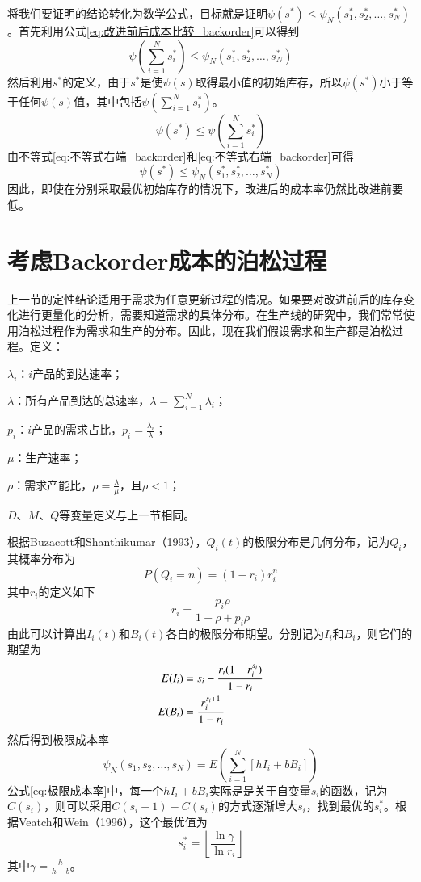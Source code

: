 将我们要证明的结论转化为数学公式，目标就是证明$\psi(s^*)\leq\psi_N(s_1^*,s_2^*,\ldots,s_N^*)$。首先利用公式\ref{eq:改进前后成本比较_backorder}可以得到
\begin{equation}
\psi(\sum_{i=1}^Ns_i^*) \leq \psi_N(s_1^*,s_2^*,\ldots,s_N^*)
\label{eq:不等式右端_backorder}
\end{equation}
然后利用$s^*$的定义，由于$s^*$是使$\psi(s)$取得最小值的初始库存，所以$\psi(s^*)$小于等于任何$\psi(s)$值，其中包括$\psi(\sum_{i=1}^Ns_i^*)$。
\begin{equation}
\psi(s^*) \leq \psi(\sum_{i=1}^Ns_i^*)
\label{eq:不等式右端_backorder}
\end{equation}
由不等式\ref{eq:不等式右端_backorder}和\ref{eq:不等式右端_backorder}可得
\[
\psi(s^*) \leq \psi_N(s_1^*,s_2^*,\ldots,s_N^*)
\]
因此，即使在分别采取最优初始库存的情况下，改进后的成本率仍然比改进前要低。









\section{考虑Backorder成本的泊松过程}

上一节的定性结论适用于需求为任意更新过程的情况。如果要对改进前后的库存变化进行更量化的分析，需要知道需求的具体分布。在生产线的研究中，我们常常使用泊松过程作为需求和生产的分布。因此，现在我们假设需求和生产都是泊松过程。定义：

$\lambda_i$：$i$产品的到达速率；

$\lambda$：所有产品到达的总速率，$\lambda=\sum_{i=1}^N\lambda_i$；

$p_i$：$i$产品的需求占比，$p_i=\frac{\lambda_i}{\lambda}$；

$\mu$：生产速率；

$\rho$：需求产能比，$\rho = \frac{\lambda}{\mu}$，且$\rho<1$；

$D$、$M$、$Q$等变量定义与上一节相同。

根据Buzacott和Shanthikumar（1993）\cite{buzacott_stochastic_1993}，$Q_i(t)$的极限分布是几何分布，记为$Q_i$，其概率分布为
\[
P(Q_i=n)=(1-r_i)r_i^n
\]
其中$r_i$的定义如下
\[
r_i = \frac{p_i\rho}{1-\rho+p_i\rho}
\]
由此可以计算出$I_i(t)$和$B_i(t)$各自的极限分布期望。分别记为$I_i$和$B_i$，则它们的期望为
\begin{align}
E(I_i) &= s_i - \frac{r_i(1-r_i^{s_i})}{1-r_i} \notag\\
E(B_i) &= \frac{r_i^{s_i+1}}{1-r_i} \notag 
\end{align}
然后得到极限成本率
\begin{equation}
\psi_N(s_1,s_2,\ldots,s_N) = E\left(\sum_{i=1}^N[hI_i+bB_i]\right)
\label{eq:极限成本率}
\end{equation}
公式\ref{eq:极限成本率}中，每一个$hI_i+bB_i$实际是是关于自变量$s_i$的函数，记为$C(s_i)$，则可以采用$C(s_i+1)-C(s_i)$的方式逐渐增大$s_i$，找到最优的$s_i^*$。根据Veatch和Wein（1996）\cite{veatch_scheduling_1996}，这个最优值为
\begin{equation}
s_i^* = \left\lfloor\frac{\ln\gamma}{\ln r_i}\right\rfloor
\label{eq:泊松分布下的最优初始库存_backorder}
\end{equation}
其中$\gamma=\frac{h}{h+b}$。

